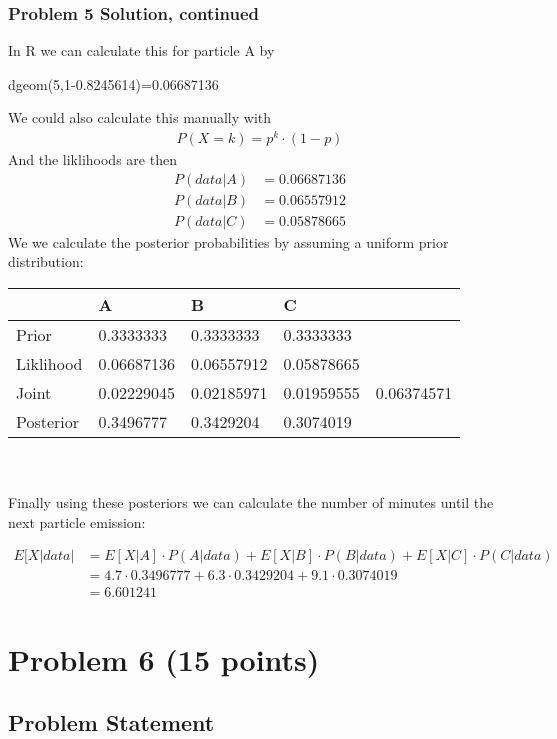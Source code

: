 \documentclass[12pt]{article}
\theoremstyle{definition}
\begin{document}
\newpage
\subsubsection*{Problem 5 Solution, continued}
In R we can calculate this for particle A by
\begin{verbatim*}
dgeom(5,1-0.8245614)=0.06687136
\end{verbatim*}
We could also calculate this manually with
\begin{align*}
P(X = k) = p^k \cdot (1 - p)
\end{align*}
And the liklihoods are then
\begin{align*}
P(data|A) &= 0.06687136\\
P(data|B) &= 0.06557912\\
P(data|C) &= 0.05878665
\end{align*}
We we calculate the posterior probabilities by assuming a uniform prior distribution:

\begin{tabular}{lllll}
&   A   &   B   &   C   \\
\hline
Prior      &   0.3333333   &   0.3333333   &   0.3333333   &\\
Liklihood  &   0.06687136   &   0.06557912   &   0.05878665   &\\
Joint      &   0.02229045   &   0.02185971   &   0.01959555   &   0.06374571\\
Posterior  &   0.3496777   &   0.3429204   &   0.3074019   &\\
\hline
\end{tabular}
\\\\
Finally using these posteriors we can calculate the number of minutes until the next particle emission:

\begin{align*}
E[X|data| &= E[X|A] \cdot P(A|data) + E[X|B] \cdot P(B|data) + E[X|C] \cdot P(C|data)\\
&= 4.7 \cdot 0.3496777 + 6.3 \cdot 0.3429204 + 9.1 \cdot 0.3074019\\
&= 6.601241
\end{align*}


\newpage
\section*{Problem 6 (15 points)}

\subsection*{Problem Statement}
\end{document}
